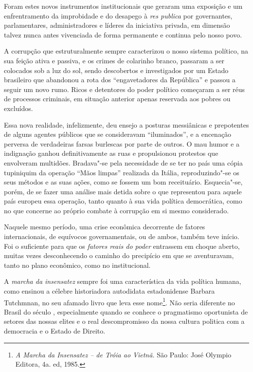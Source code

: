 Foram estes novos instrumentos institucionais que geraram uma exposição
e um enfrentramento da improbidade e do desapego à \emph{res publica}
por governantes, parlamentares, administradores e líderes da iniciativa
privada, em dimensão talvez nunca antes vivenciada de forma permanente e
continua pelo nosso povo.

A corrupção que estruturalmente sempre caracterizou o nosso sistema
político, na sua feição ativa e passiva, e os crimes de colarinho
branco, passaram a ser colocados sob a luz do sol, sendo descobertos e
investigados por um Estado brasileiro que abandonou a rota dos
``engavetadores da República'' e passou a seguir um novo rumo. Ricos e
detentores do poder político começaram a ser réus de processos
criminais, em situação anterior apenas reservada aos pobres ou
excluídos.

Essa nova realidade, infelizmente, deu ensejo a posturas messiânicas e
prepotentes de alguns agentes públicos que se consideravam
``iluminados'', e a encenação perversa de verdadeiras farsas burlescas
por parte de outros. O mau humor e a indignação ganhou definitivamente
as ruas e propulsionou protestos que envolveram multidões. Bradava"-se
pela necessidade de se ter no país uma cópia tupiniquim da operação
``Mãos limpas'' realizada da Itália, reproduzindo"-se os seus
métodos e as suas ações, como se fossem um bom receituário. Esquecia"-se,
porém, de se fazer uma análise mais detida sobre o que representou para
aquele país europeu essa operação, tanto quanto à sua vida política
democrática, como no que concerne ao próprio combate à corrupção em si
mesmo considerado.

Naquele mesmo período, uma crise econômica decorrente de fatores
internacionais, de equívocos governamentais, ou de ambos, também teve
início. Foi o suficiente para que os \emph{fatores reais do poder}
entrassem em choque aberto, muitas vezes desconhecendo o caminho do
precipício em que se aventuravam, tanto no plano econômico, como no
institucional.

A \emph{marcha da insensatez} sempre foi uma característica da vida
política humana, como ensinou a célebre historiadora autodidata
estadonidense Barbara Tutchmnan, no seu afamado livro que leva esse
nome\footnote{\emph{A Marcha da Insensatez -- de Tróia ao Vietnã.} São
  Paulo: José Olympio Editora, 4a. ed, 1985.}. Não seria diferente no
Brasil do século , especialmente quando se conhece o pragmatismo
oportunista de setores das nossas elites e o real descompromisso da
nossa cultura politica com a democracia e o Estado de Direito.


